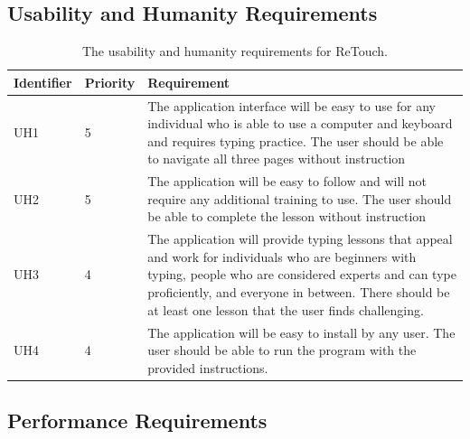 \documentclass[12pt, titlepage]{article}
\begin{document}
\subsection{Usability and Humanity Requirements}

\begin{table}[H]
  \caption{The usability and humanity requirements for ReTouch.}
\begin{tabular}{ |m{2cm}|m{1.8cm}|m{9.4cm}| }
    \hline
    \textbf{Identifier} & \textbf{Priority} & \textbf{Requirement} \\ 
    \hline
    {\color{cyan}UH1} & 5 & The application interface will be easy to use for any individual who is able to use a computer and keyboard and requires typing practice. {\color{cyan}The user should be able to navigate all three pages without instruction}\\
    \hline
    {\color{cyan}UH2} & 5 & The application will be easy to follow and will not require any additional training to use. {\color{cyan}The user should be able to complete the lesson without instruction}\\ 
    \hline
    {\color{cyan}UH3} & 4 & The application will provide typing lessons that appeal and work for individuals who are beginners with typing, people who are considered experts and can type proficiently, and everyone in between. {\color{cyan}There should be at least one lesson that the user finds challenging.}\\
    \hline
    {\color{cyan}UH4} & 4 & The application will be easy to install by any user. {\color{cyan}The user should be able to run the program with the provided instructions.}\\
    \hline
\end{tabular}
\end{table}

\subsection{Performance Requirements}
\end{document}

